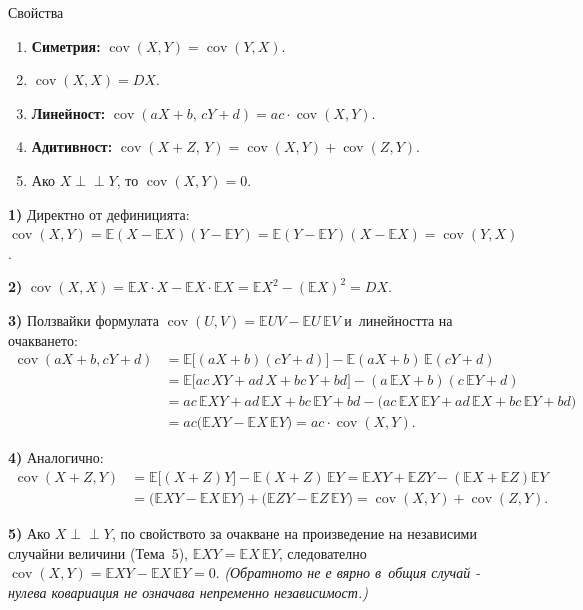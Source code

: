 \begin{thmbox}[~(на ковариацията)]{Свойства}
\begin{enumerate}[label=\arabic*)]
  \item \textbf{Симетрия:} $\operatorname{cov}(X,Y)=\operatorname{cov}(Y,X)$.
  \item $\operatorname{cov}(X,X)=DX$.
  \item \textbf{Линейност:} $\operatorname{cov}(aX+b,\,cY+d) = ac\cdot\operatorname{cov}(X,Y)$.
  \item \textbf{Адитивност:} $\operatorname{cov}(X+Z,\,Y) = \operatorname{cov}(X,Y)+\operatorname{cov}(Z,Y)$.
  \item Ако $X\perp\!\!\!\perp Y$, то $\operatorname{cov}(X,Y)=0$.
\end{enumerate}
\end{thmbox}

\begin{proofbox}
\textbf{1)} Директно от дефиницията: $\operatorname{cov}(X,Y)=\mathbb
E(X-\mathbb EX)(Y-\mathbb EY) = \mathbb E(Y-\mathbb EY)(X-\mathbb EX)
= \operatorname{cov}(Y,X)$.

\textbf{2)} $\operatorname{cov}(X,X) = \mathbb EX\cdot X - \mathbb
EX\cdot\mathbb EX = \mathbb EX^2-(\mathbb EX)^2 = DX$.

\textbf{3)} Ползвайки формулата $\operatorname{cov}(U,V)=\mathbb
EUV-\mathbb EU\,\mathbb EV$ и~линейността на очакването:
\begin{align*}
  \operatorname{cov}(aX+b,cY+d) &= \mathbb E\big[(aX+b)(cY+d)\big] - \mathbb E(aX+b)\,\mathbb E(cY+d)\\
  &= \mathbb E\big[ac\,XY+ad\,X+bc\,Y+bd\big] - (a\,\mathbb EX+b)(c\,\mathbb EY+d)\\
  &= ac\,\mathbb EXY+ad\,\mathbb EX+bc\,\mathbb EY+bd - \big(ac\,\mathbb EX\,\mathbb EY+ad\,\mathbb EX+bc\,\mathbb EY+bd\big)\\
  &= ac\big(\mathbb EXY-\mathbb EX\,\mathbb EY\big) = ac\cdot\operatorname{cov}(X,Y).
\end{align*}

\textbf{4)} Аналогично:
\begin{align*}
  \operatorname{cov}(X+Z,Y) &= \mathbb E\big[(X+Z)Y\big] - \mathbb E(X+Z)\,\mathbb EY = \mathbb EXY+\mathbb EZY - (\mathbb EX+\mathbb EZ)\mathbb EY\\
  &= \big(\mathbb EXY-\mathbb EX\,\mathbb EY\big) + \big(\mathbb EZY-\mathbb EZ\,\mathbb EY\big) = \operatorname{cov}(X,Y)+\operatorname{cov}(Z,Y).
\end{align*}

\textbf{5)} Ако $X\perp\!\!\!\perp Y$, по свойството за очакване на
произведение на независими случайни величини (Тема~5),
$\mathbb EXY=\mathbb EX\,\mathbb EY$, следователно
$\operatorname{cov}(X,Y)=\mathbb EXY-\mathbb EX\,\mathbb EY=0$.
\emph{(Обратното не е вярно в~общия случай - нулева ковариация не
означава непременно независимост.)} \qedbg
\end{proofbox}

